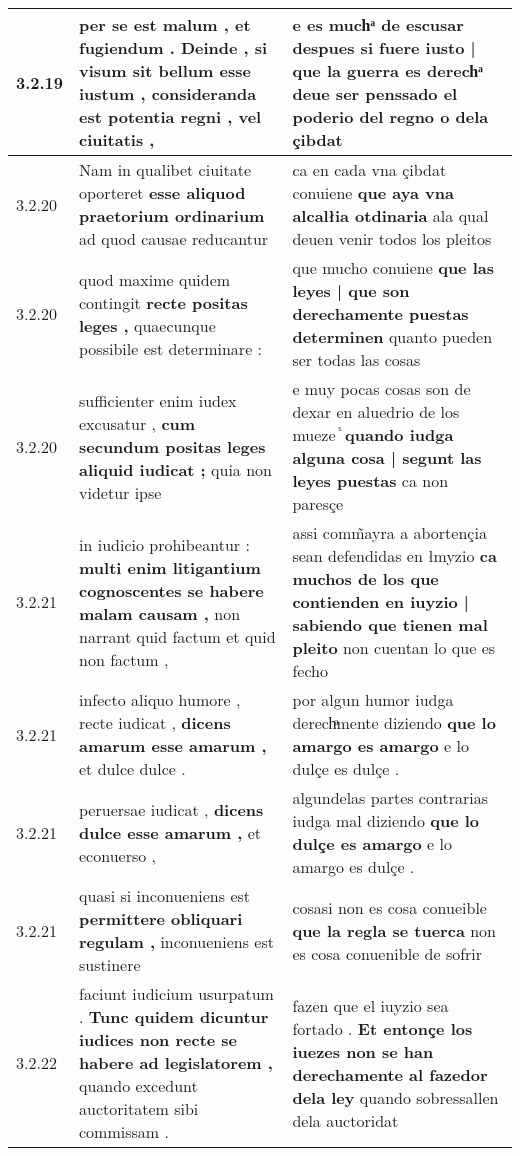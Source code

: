 \begin{tabular}{|p{1cm}|p{6.5cm}|p{6.5cm}|}
3.2.19 & per se est malum , et fugiendum . \textbf{ Deinde , si visum sit bellum esse iustum , } consideranda est potentia regni , vel ciuitatis , & e es muchͣ de escusar \textbf{ despues si fuere iusto | que la guerra es derechͣ } deue ser penssado el poderio del regno o dela çibdat \\\hline
3.2.20 & Nam in qualibet ciuitate oporteret \textbf{ esse aliquod praetorium ordinarium } ad quod causae reducantur & ca en cada vna çibdat conuiene \textbf{ que aya vna alcalłia otdinaria } ala qual deuen venir todos los pleitos \\\hline
3.2.20 & quod maxime quidem contingit \textbf{ recte positas leges , } quaecunque possibile est determinare : & que mucho conuiene \textbf{ que las leyes | que son derechamente puestas determinen } quanto pueden ser todas las cosas \\\hline
3.2.20 & sufficienter enim iudex excusatur , \textbf{ cum secundum positas leges aliquid iudicat ; } quia non videtur ipse & e muy pocas cosas son de dexar en aluedrio de los mueze ᷤ \textbf{ quando iudga alguna cosa | segunt las leyes puestas } ca non paresçe \\\hline
3.2.21 & in iudicio prohibeantur : \textbf{ multi enim litigantium cognoscentes se habere malam causam , } non narrant quid factum et quid non factum , & assi comm̃ayra a abortençia sean defendidas en łmyzio \textbf{ ca muchos de los que contienden en iuyzio | sabiendo que tienen mal pleito } non cuentan lo que es fecho \\\hline
3.2.21 & infecto aliquo humore , recte iudicat , \textbf{ dicens amarum esse amarum , } et dulce dulce . & por algun humor iudga derechͣmente diziendo \textbf{ que lo amargo es amargo } e lo dulçe es dulçe . \\\hline
3.2.21 & peruersae iudicat , \textbf{ dicens dulce esse amarum , } et econuerso , & algundelas partes contrarias iudga mal diziendo \textbf{ que lo dulçe es amargo } e lo amargo es dulçe . \\\hline
3.2.21 & quasi si inconueniens est \textbf{ permittere obliquari regulam , } inconueniens est sustinere & cosasi non es cosa conueible \textbf{ que la regla se tuerca } non es cosa conuenible de sofrir \\\hline
3.2.22 & faciunt iudicium usurpatum . \textbf{ Tunc quidem dicuntur iudices non recte se habere ad legislatorem , } quando excedunt auctoritatem sibi commissam . & fazen que el iuyzio sea fortado . \textbf{ Et entonçe los iuezes non se han derechamente al fazedor dela ley } quando sobressallen dela auctoridat \\\hline

\end{tabular}
